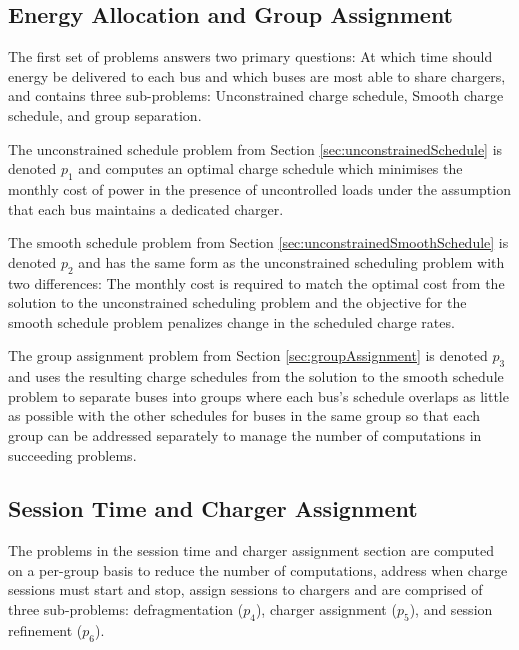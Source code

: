 \subsection{Energy Allocation and Group Assignment} 
\par The first set of problems answers two primary questions: At which time should energy be delivered to each bus and which buses are most able to share chargers, and contains three sub-problems: Unconstrained charge schedule, Smooth charge schedule, and group separation.  
\par The unconstrained schedule problem from Section \ref{sec:unconstrainedSchedule} is denoted $p_1$ and computes an optimal charge schedule which minimises the monthly cost of power in the presence of uncontrolled loads under the assumption that each bus maintains a dedicated charger.  
\par The smooth schedule problem from Section \ref{sec:unconstrainedSmoothSchedule} is denoted $p_2$ and has the same form as the unconstrained scheduling problem with two differences: The monthly cost is required to match the optimal cost from the solution to the unconstrained scheduling problem and the objective for the smooth schedule problem penalizes change in the scheduled charge rates.  
\par The group assignment problem from Section \ref{sec:groupAssignment} is denoted $p_3$ and uses the resulting charge schedules from the solution to the smooth schedule problem to separate buses into groups where each bus's schedule overlaps as little as possible with the other schedules for buses in the same group so that each group can be addressed separately to manage the number of computations in succeeding problems.  

\subsection{Session Time and Charger Assignment} 
The problems in the session time and charger assignment section are computed on a per-group basis to reduce the number of computations, address when charge sessions must start and stop, assign sessions to chargers and are comprised of three sub-problems: defragmentation ($p_4$), charger assignment ($p_5$), and session refinement ($p_6$).

